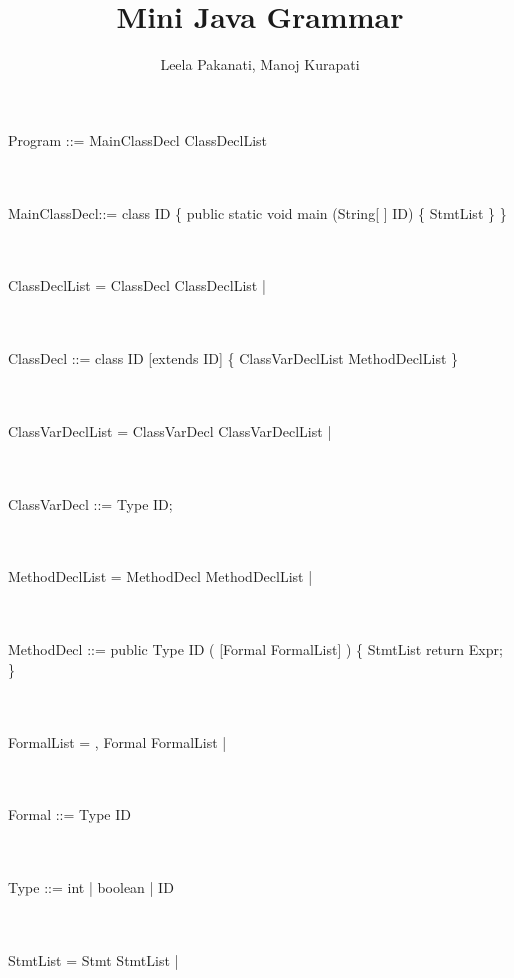 \documentclass[a4paper,portrait,12pt]{article}
\title{Mini Java Grammar}
\date{}
\author{Leela Pakanati, Manoj Kurapati}
\begin{document}
\maketitle

\hspace*{-.25in}Program ::=	MainClassDecl ClassDeclList 

\\~\\
MainClassDecl::=	class ID \{ public static void main (String[ ] ID) \{ StmtList \} \} 

\\~\\
ClassDeclList =	ClassDecl ClassDeclList				\newline
\hspace*{.625in} | \epsilon

\\~\\
ClassDecl ::=	class ID [extends ID] \{ ClassVarDeclList MethodDeclList \} 

\\~\\
ClassVarDeclList =	ClassVarDecl ClassVarDeclList	\newline
\hspace*{.625in} | \epsilon

\\~\\
ClassVarDecl ::=	Type ID; 

\\~\\
MethodDeclList =	MethodDecl MethodDeclList		\newline
\hspace*{.625in} | \epsilon

\\~\\
MethodDecl ::=	public Type ID ( [Formal FormalList] ) \{ StmtList return Expr; \} 

\\~\\
FormalList =	, Formal FormalList					\newline
\hspace*{.625in} | \epsilon

\\~\\
Formal ::=	Type ID

\\~\\
Type ::=	int | boolean | ID 

\\~\\
StmtList =	Stmt StmtList						\newline
\hspace*{.625in} | \epsilon
\end{document}

